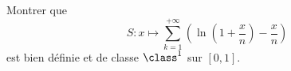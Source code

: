 \begin{enonce}
\begin{exercise}[ID={RMS135 E1457},subtitle={IMT MP 2024},tags={},difficulty={}]

Montrer que
\begin{equation*}
S : x \mapsto \sum_{k=1}^{+\infty} \left( \ln\left(1 + \frac{x}{n} \right) - \frac{x}{n} \right)
\end{equation*}
est bien définie et de classe $\class^1$ sur $[0, 1]$.

\end{exercise}
\begin{solution}
\end{solution}
\end{enonce}
